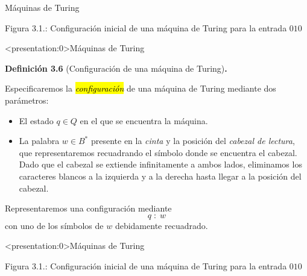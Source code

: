 \documentclass[10pt,xcolor=dvipsnames,aspectratio=169,spanish]{beamer}
\makeatletter
\let\HL\hl
\renewcommand\hl{%
  \let\set@color\beamerorig@set@color
  \let\reset@color\beamerorig@reset@color
  \HL}
\newcommand{\hle}[1]{\hl{\emph{#1}}}
\makeatother
\begin{document}
\begin{frame}{Máquinas de Turing}

\vspace{5mm}
\begin{adjustbox}{max height={.67\textheight},center}

\end{adjustbox}

\begin{center}
{\small Figura 3.1.: Configuración inicial de una máquina de Turing para la entrada $010$}
\end{center}

\end{frame}

\begin{frame}<presentation:0>{Máquinas de Turing}

\textbf{Definición 3.6} (Configuración de una máquina de Turing)\textbf{.}

Especificaremos la \hle{configuración} de una máquina de Turing mediante dos parámetros:

\begin{itemize}
    \item El estado $q\in Q$ en el que se encuentra la máquina.
    \item La palabra $w \in B^*$ presente en la \emph{cinta} y la posición del \emph{cabezal de lectura}, que representaremos recuadrando el símbolo donde se encuentra el cabezal. Dado que el cabezal se extiende infinitamente a ambos lados, eliminamos los caracteres blancos a la izquierda y a la derecha hasta llegar a la posición del cabezal.
\end{itemize}

Representaremos una configuración mediante $$q\;:\;w$$ con uno de los símbolos de $w$ debidamente recuadrado.

\end{frame}

\begin{frame}<presentation:0>{Máquinas de Turing}

\vspace{5mm}
\begin{adjustbox}{max height={.67\textheight},center}

\end{adjustbox}

\begin{center}
{\small Figura 3.1.: Configuración inicial de una máquina de Turing para la entrada $010$}
\end{center}

\end{frame}
\end{document}
